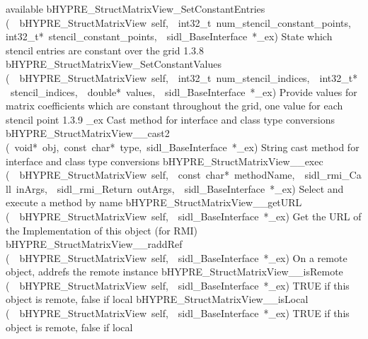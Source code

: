 \documentclass{article}
\begin{document}
\begin{cxxentry}
\begin{cxxentry}
\begin{cxxnames}
{available}
        {}
\label{cxx.1.3.11}
        {bHYPRE\_StructMatrixView\_SetConstantEntries}
        {(\ \ bHYPRE\_StructMatrixView\ self,\ \ int32\_t\ num\_stencil\_constant\_points,\ \ int32\_t*\ stencil\_constant\_points,\ \ sidl\_BaseInterface\ *\_ex)}
        {
State which stencil entries are constant over the grid}
        {1.3.8}
        {bHYPRE\_StructMatrixView\_SetConstantValues}
        {(\ \ bHYPRE\_StructMatrixView\ self,\ \ int32\_t\ num\_stencil\_indices,\ \ int32\_t*\ stencil\_indices,\ \ double*\ values,\ \ sidl\_BaseInterface\ *\_ex)}
        {
Provide values for matrix coefficients which are constant throughout
the grid, one value for each stencil point}
        {1.3.9}
        {\_ex}
        {}
        {
Cast method for interface and class type conversions}
        {}
\label{cxx.1.3.12}
        {bHYPRE\_StructMatrixView\_\_cast2}
        {(\ void*\ obj,\ const\ char*\ type,\ sidl\_BaseInterface\ *\_ex)}
        {
String cast method for interface and class type conversions}
        {}
\label{cxx.1.3.13}
        {bHYPRE\_StructMatrixView\_\_exec}
        {(\ \ bHYPRE\_StructMatrixView\ self,\ \ const\ char*\ methodName,\ \ sidl\_rmi\_Call\ inArgs,\ \ sidl\_rmi\_Return\ outArgs,\ \ sidl\_BaseInterface\ *\_ex)}
        {
Select and execute a method by name}
        {}
\label{cxx.1.3.14}
        {bHYPRE\_StructMatrixView\_\_getURL}
        {(\ \ bHYPRE\_StructMatrixView\ self,\ \ sidl\_BaseInterface\ *\_ex)}
        {
Get the URL of the Implementation of this object (for RMI)}
        {}
\label{cxx.1.3.15}
        {bHYPRE\_StructMatrixView\_\_raddRef}
        {(\ \ bHYPRE\_StructMatrixView\ self,\ \ sidl\_BaseInterface\ *\_ex)}
        {
On a remote object, addrefs the remote instance}
        {}
\label{cxx.1.3.16}
        {bHYPRE\_StructMatrixView\_\_isRemote}
        {(\ \ bHYPRE\_StructMatrixView\ self,\ \ sidl\_BaseInterface\ *\_ex)}
        {
TRUE if this object is remote, false if local}
        {}
\label{cxx.1.3.17}
        {bHYPRE\_StructMatrixView\_\_isLocal}
        {(\ \ bHYPRE\_StructMatrixView\ self,\ \ sidl\_BaseInterface\ *\_ex)}
        {
TRUE if this object is remote, false if local}
        {}
\label{cxx.1.3.18}

\end{cxxnames}
\end{cxxentry}
\end{cxxentry}
\end{document}
